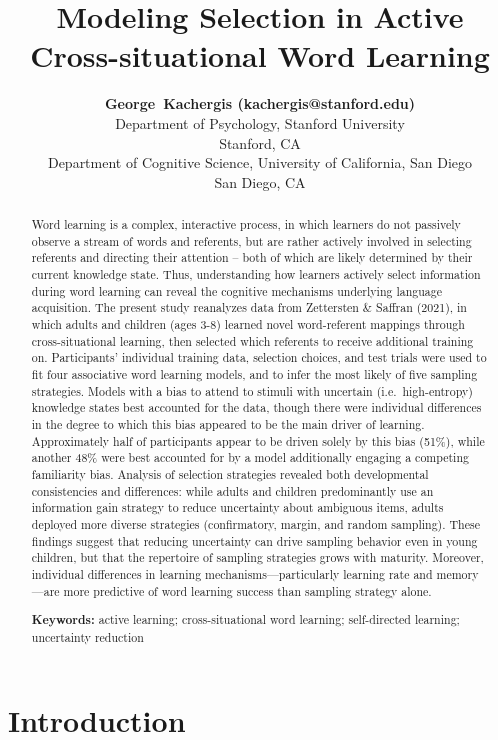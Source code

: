 \documentclass[10pt, letterpaper]{article}
\title{Modeling Selection in Active Cross-situational Word Learning}
\author{{\large \bf George~Kachergis (kachergis@stanford.edu)} \\ Department of Psychology, Stanford University \\ Stanford, CA \AND {\large \bf Martin~Zettersten (mzettersten@ucsd.edu)} \\ Department of Cognitive Science, University of California, San Diego \\ San Diego, CA}
\begin{document}
\maketitle

\begin{abstract}
Word learning is a complex, interactive process, in which learners do
not passively observe a stream of words and referents, but are rather
actively involved in selecting referents and directing their attention
-- both of which are likely determined by their current knowledge state.
Thus, understanding how learners actively select information during word
learning can reveal the cognitive mechanisms underlying language
acquisition. The present study reanalyzes data from Zettersten \&
Saffran (2021), in which adults and children (ages 3-8) learned novel
word-referent mappings through cross-situational learning, then selected
which referents to receive additional training on. Participants'
individual training data, selection choices, and test trials were used
to fit four associative word learning models, and to infer the most
likely of five sampling strategies. Models with a bias to attend to
stimuli with uncertain (i.e.~high-entropy) knowledge states best
accounted for the data, though there were individual differences in the
degree to which this bias appeared to be the main driver of learning.
Approximately half of participants appear to be driven solely by this
bias (51\%), while another 48\% were best accounted for by a model
additionally engaging a competing familiarity bias. Analysis of
selection strategies revealed both developmental consistencies and
differences: while adults and children predominantly use an information
gain strategy to reduce uncertainty about ambiguous items, adults
deployed more diverse strategies (confirmatory, margin, and random
sampling). These findings suggest that reducing uncertainty can drive
sampling behavior even in young children, but that the repertoire of
sampling strategies grows with maturity. Moreover, individual
differences in learning mechanisms---particularly learning rate and
memory---are more predictive of word learning success than sampling
strategy alone.

\textbf{Keywords:}
active learning; cross-situational word learning; self-directed
learning; uncertainty reduction
\end{abstract}

\section{Introduction}\label{introduction}
\end{document}
